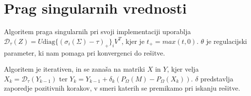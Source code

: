 \section{Prag singularnih vrednosti}

Algoritem praga singularnih pri svoji implementaciji uporablja $\mathcal{D}_\tau(Z) = U \textrm{diag}\{(\sigma_i(\Sigma)-\tau)_+\}_i V^T$, kjer je $t_+ = max(t, 0)$.
$\theta$ je regulacijski parameter, ki nam pomaga pri konvergenci do rešitve. \cite{CCS}

Algoritem je iterativen, in se zanaša na matriki $X$ in $Y$, kjer velja $X_k = \mathcal{D}_\tau(Y_{k-1})$ ter $Y_k = Y_{k-1} + \delta_k(P_\Omega(M) - P_\Omega(X_k))$. $\delta$ predstavlja zaporedje pozitivnih korakov, v smeri katerih se premikamo pri iskanju rešitve. 